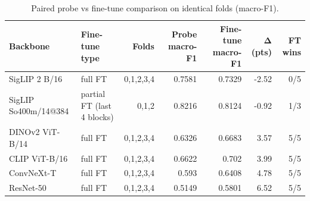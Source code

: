 \begin{table}[t]
\centering\small
\caption{Paired probe vs fine-tune comparison on identical folds (macro-F1).}
\label{tab:probe_vs_finetune}
\begin{tabular}{llrrrrr}
\toprule
Backbone & Fine-tune type & Folds & Probe macro-F1 & Fine-tune macro-F1 & Δ (pts) & FT wins \\
\midrule
SigLIP 2 B/16 & full FT & 0,1,2,3,4 & 0.7581 & 0.7329 & -2.52 & 0/5 \\
SigLIP So400m/14@384 & partial FT (last 4 blocks) & 0,1,2 & 0.8216 & 0.8124 & -0.92 & 1/3 \\
DINOv2 ViT-B/14 & full FT & 0,1,2,3,4 & 0.6326 & 0.6683 & 3.57 & 5/5 \\
CLIP ViT-B/16 & full FT & 0,1,2,3,4 & 0.6622 & 0.702 & 3.99 & 5/5 \\
ConvNeXt-T & full FT & 0,1,2,3,4 & 0.593 & 0.6408 & 4.78 & 5/5 \\
ResNet-50 & full FT & 0,1,2,3,4 & 0.5149 & 0.5801 & 6.52 & 5/5 \\
\bottomrule
\end{tabular}
\end{table}
